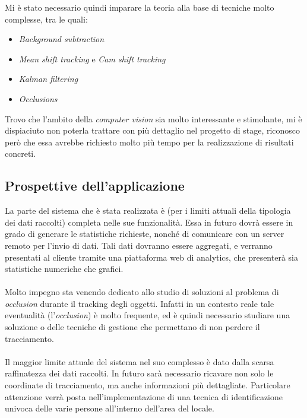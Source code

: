 \begin{itemize}
	Mi è stato necessario quindi imparare la teoria alla base di tecniche molto complesse, tra le quali:
	\begin{itemize}
		\item \textit{Background subtraction}
		\item \textit{Mean shift tracking} e \textit{Cam shift tracking}
		\item \textit{Kalman filtering}
		\item \textit{Occlusions}
	\end{itemize}
	Trovo che l'ambito della \textit{computer vision} sia molto interessante e stimolante, mi è dispiaciuto non poterla trattare con più dettaglio nel progetto di stage, riconosco però che essa avrebbe richiesto molto più tempo per la realizzazione di risultati concreti.
\end{itemize}

\subsection{Prospettive dell'applicazione}
La parte del sistema che è stata realizzata è (per i limiti attuali della tipologia dei dati raccolti) completa nelle sue funzionalità. Essa in futuro dovrà essere in grado di generare le statistiche richieste, nonché di comunicare con un server remoto per l'invio di dati. Tali dati dovranno essere aggregati, e verranno presentati al cliente tramite una piattaforma web di analytics, che presenterà sia statistiche numeriche che grafici. \\ \\
Molto impegno sta venendo dedicato allo studio di soluzioni al problema di \textit{occlusion} durante il tracking degli oggetti. Infatti in un contesto reale tale eventualità (l'\textit{occlusion}) è molto frequente, ed è quindi necessario studiare una soluzione o delle tecniche di gestione che permettano di non perdere il tracciamento.\\ \\
Il maggior limite attuale del sistema nel suo complesso è dato dalla scarsa raffinatezza dei dati raccolti. In futuro sarà necessario ricavare non solo le coordinate di tracciamento, ma anche informazioni più dettagliate. Particolare attenzione verrà posta nell'implementazione di una tecnica di identificazione univoca delle varie persone all'interno dell'area del locale. 



